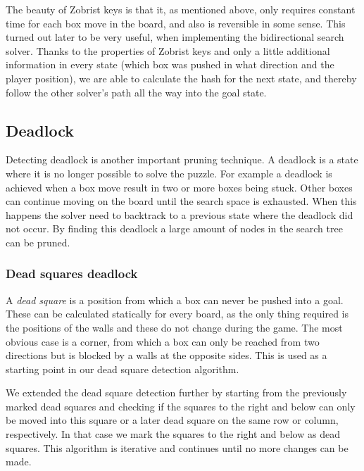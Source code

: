 \documentclass[a4paper,12pt]{article}
\renewcommand{\*}[0]{\cdot}
\begin{document}
The beauty of Zobrist keys is that it, as mentioned above, only requires
constant time for each box move in the board, and also is reversible in some
sense. This turned out later to be very useful, when implementing the
bidirectional search solver. Thanks to the properties of Zobrist keys and only a
little additional information in every state (which box was pushed in what
direction and the player position), we are able to calculate the hash for the
next state, and thereby follow the other solver's path all the way into the goal
state.


\subsection{Deadlock}

Detecting deadlock is another important pruning technique. A deadlock is a
state where it is no longer possible to solve the puzzle. For example a deadlock
is achieved when a box move result in two or more boxes being stuck. Other boxes
can continue moving on the board until the search space is exhausted. When this
happens the solver need to backtrack to a previous state where the deadlock did
not occur. By finding this deadlock a large amount of nodes in the search tree
can be pruned.

\subsubsection{Dead squares deadlock}

A \emph{dead square} is a position from which a box can never be pushed into a
goal. These can be calculated statically for every board, as the only thing
required is the positions of the walls and these do not change during the game.
The most obvious case is a corner, from which a box can only be reached from two
directions but is blocked by a walls at the opposite sides. This is used as a
starting point in our dead square detection algorithm.

We extended the dead square detection further by starting from the previously
marked dead squares and checking if the squares to the right and below can only
be moved into this square or a later dead square on the same row or column,
respectively. In that case we mark the squares to the right and below as dead
squares. This algorithm is iterative and continues until no more changes can
be made.
\end{document}
